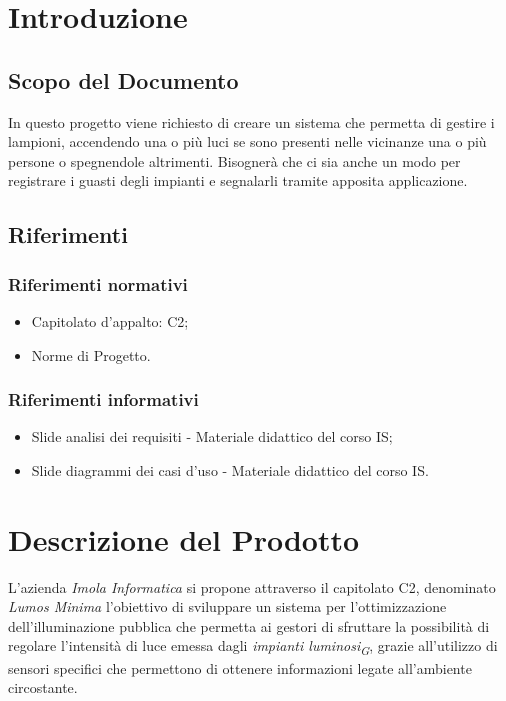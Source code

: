 \documentclass[a4paper, 12pt]{article}
\begin{document}
\makeindexdetails
\makefrontpage \makeversioni
\tableofcontents
\newpage
\clearpage
{}

\section{Introduzione}
\subsection{Scopo del Documento}
In questo progetto viene richiesto di creare un sistema che permetta di gestire i lampioni, accendendo una o più luci se sono presenti nelle vicinanze una o più persone o spegnendole altrimenti.\newline
Bisognerà che ci sia anche un modo per registrare i guasti degli impianti e segnalarli tramite apposita applicazione.

\subsection{Riferimenti}
\subsubsection*{Riferimenti normativi}
\begin{itemize}
    \item Capitolato d'appalto: C2;
    \item Norme di Progetto.
\end{itemize}

\subsubsection*{Riferimenti informativi}
\begin{itemize}
    \item Slide analisi dei requisiti - Materiale didattico del corso IS;
    \item Slide diagrammi dei casi d'uso - Materiale didattico del corso IS.
\end{itemize}
\newpage
\section{Descrizione del Prodotto}
L'azienda \textit{Imola Informatica} si propone attraverso il capitolato C2, denominato \textit{Lumos Minima} l'obiettivo di sviluppare un sistema per l'ottimizzazione
dell'illuminazione pubblica che permetta ai gestori di sfruttare la possibilità di regolare l'intensità di luce emessa dagli \textit{impianti luminosi\textsubscript{G}}, grazie all'utilizzo di sensori specifici che permettono di ottenere informazioni legate all'ambiente circostante.
\end{document}
